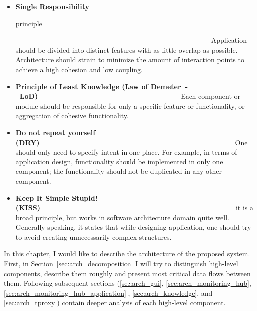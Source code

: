 \begin{itemize}

\item {\bf Single Responsibility

principle}~~~~~~~~~~~~~~~~~~~~~~~~~~~~~~~~~~~~~~~~~~~~~~~~~~~~~~~~\linebreak Application should be divided into distinct features with as little overlap as possible. Architecture should strain to minimize the amount of interaction points to achieve a high cohesion and low coupling.

\item {\bf Principle of Least Knowledge (Law of Demeter~-~LoD)}~~~~~~~~~~~~~~~~~~~~~~~~~~~~~~~~~~~~~~~~~\linebreak Each component or module should be responsible for only a specific feature or functionality, or aggregation of cohesive functionality.

\item {\bf Do not repeat yourself (DRY)}~~~~~~~~~~~~~~~~~~~~~~~~~~~~~~~~~~~~~~~~~~~~~~~~~~~~~~~~\linebreak One should only need to specify intent in one place. For example, in terms of application design, functionality should be implemented in only one component; the functionality should not be duplicated in any other component.

\item {\bf Keep It Simple Stupid! (KISS)}~~~~~~~~~~~~~~~~~~~~~~~~~~~~~~~~~~~~~~~~~~~~~~~~~~~~~~~~\linebreak it is a broad principle, but works in software architecture domain quite well. Generally speaking, it states that while designing application, one should try to avoid creating unnecessarily complex structures.
\end{itemize}

In this chapter, I would like to describe the architecture of the proposed system. First, in Section~\ref{sec:arch_decomposition} I will try to distinguish high-level components, describe them roughly and present most critical data flows between them. Following subsequent sections (\ref{sec:arch_gui}, \ref{sec:arch_monitoring_hub}, \ref{sec:arch_monitoring_hub_application} , \ref{sec:arch_knowledge}, and \ref{sec:arch_tproxy}) contain deeper analysis of each high-level component.













